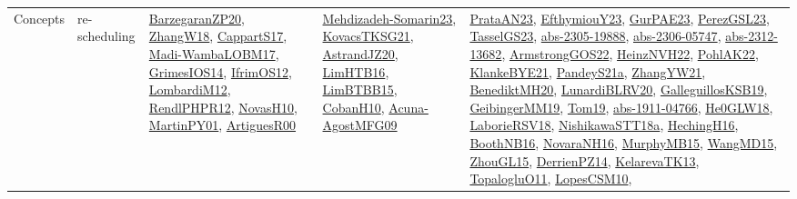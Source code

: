 {\begin{longtable}{lp{3cm}>{\raggedright}p{6cm}>{\raggedright}p{6cm}p{8cm}}
Concepts & re-scheduling & \href{papers/BarzegaranZP20.pdf}{BarzegaranZP20}\cite{BarzegaranZP20}, \href{articles/ZhangW18.pdf}{ZhangW18}\cite{ZhangW18}, \href{papers/CappartS17.pdf}{CappartS17}\cite{CappartS17}, \href{papers/Madi-WambaLOBM17.pdf}{Madi-WambaLOBM17}\cite{Madi-WambaLOBM17}, \href{articles/GrimesIOS14.pdf}{GrimesIOS14}\cite{GrimesIOS14}, \href{papers/IfrimOS12.pdf}{IfrimOS12}\cite{IfrimOS12}, \href{articles/LombardiM12.pdf}{LombardiM12}\cite{LombardiM12}, \href{papers/RendlPHPR12.pdf}{RendlPHPR12}\cite{RendlPHPR12}, \href{articles/NovasH10.pdf}{NovasH10}\cite{NovasH10}, \href{articles/MartinPY01.pdf}{MartinPY01}\cite{MartinPY01}, \href{articles/ArtiguesR00.pdf}{ArtiguesR00}\cite{ArtiguesR00} & \href{papers/Mehdizadeh-Somarin23.pdf}{Mehdizadeh-Somarin23}\cite{Mehdizadeh-Somarin23}, \href{papers/KovacsTKSG21.pdf}{KovacsTKSG21}\cite{KovacsTKSG21}, \href{articles/AstrandJZ20.pdf}{AstrandJZ20}\cite{AstrandJZ20}, \href{papers/LimHTB16.pdf}{LimHTB16}\cite{LimHTB16}, \href{papers/LimBTBB15.pdf}{LimBTBB15}\cite{LimBTBB15}, \href{papers/CobanH10.pdf}{CobanH10}\cite{CobanH10}, \href{papers/Acuna-AgostMFG09.pdf}{Acuna-AgostMFG09}\cite{Acuna-AgostMFG09} & \href{articles/PrataAN23.pdf}{PrataAN23}\cite{PrataAN23}, \href{papers/EfthymiouY23.pdf}{EfthymiouY23}\cite{EfthymiouY23}, \href{articles/GurPAE23.pdf}{GurPAE23}\cite{GurPAE23}, \href{papers/PerezGSL23.pdf}{PerezGSL23}\cite{PerezGSL23}, \href{papers/TasselGS23.pdf}{TasselGS23}\cite{TasselGS23}, \href{articles/abs-2305-19888.pdf}{abs-2305-19888}\cite{abs-2305-19888}, \href{articles/abs-2306-05747.pdf}{abs-2306-05747}\cite{abs-2306-05747}, \href{articles/abs-2312-13682.pdf}{abs-2312-13682}\cite{abs-2312-13682}, \href{papers/ArmstrongGOS22.pdf}{ArmstrongGOS22}\cite{ArmstrongGOS22}, \href{articles/HeinzNVH22.pdf}{HeinzNVH22}\cite{HeinzNVH22}, \href{articles/PohlAK22.pdf}{PohlAK22}\cite{PohlAK22}, \href{papers/KlankeBYE21.pdf}{KlankeBYE21}\cite{KlankeBYE21}, \href{articles/PandeyS21a.pdf}{PandeyS21a}\cite{PandeyS21a}, \href{articles/ZhangYW21.pdf}{ZhangYW21}\cite{ZhangYW21}, \href{articles/BenediktMH20.pdf}{BenediktMH20}\cite{BenediktMH20}, \href{articles/LunardiBLRV20.pdf}{LunardiBLRV20}\cite{LunardiBLRV20}, \href{papers/GalleguillosKSB19.pdf}{GalleguillosKSB19}\cite{GalleguillosKSB19}, \href{papers/GeibingerMM19.pdf}{GeibingerMM19}\cite{GeibingerMM19}, \href{papers/Tom19.pdf}{Tom19}\cite{Tom19}, \href{articles/abs-1911-04766.pdf}{abs-1911-04766}\cite{abs-1911-04766}, \href{papers/He0GLW18.pdf}{He0GLW18}\cite{He0GLW18}, \href{articles/LaborieRSV18.pdf}{LaborieRSV18}\cite{LaborieRSV18}, \href{papers/NishikawaSTT18a.pdf}{NishikawaSTT18a}\cite{NishikawaSTT18a}, \href{papers/HechingH16.pdf}{HechingH16}\cite{HechingH16}, \href{papers/BoothNB16.pdf}{BoothNB16}\cite{BoothNB16}, \href{articles/NovaraNH16.pdf}{NovaraNH16}\cite{NovaraNH16}, \href{papers/MurphyMB15.pdf}{MurphyMB15}\cite{MurphyMB15}, \href{articles/WangMD15.pdf}{WangMD15}\cite{WangMD15}, \href{papers/ZhouGL15.pdf}{ZhouGL15}\cite{ZhouGL15}, \href{papers/DerrienPZ14.pdf}{DerrienPZ14}\cite{DerrienPZ14}, \href{papers/KelarevaTK13.pdf}{KelarevaTK13}\cite{KelarevaTK13}, \href{articles/TopalogluO11.pdf}{TopalogluO11}\cite{TopalogluO11}, \href{articles/LopesCSM10.pdf}{LopesCSM10}\cite{LopesCSM10}, 
\end{longtable}}
